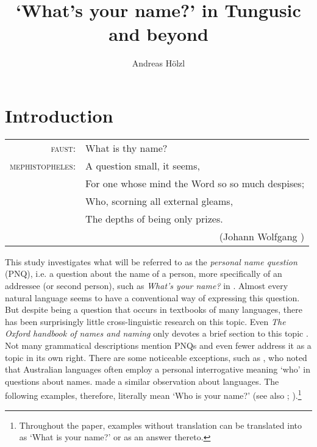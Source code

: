 \documentclass[output=paper,colorlinks,citecolor=brown]{langscibook}
\author{Andreas Hölzl\affiliation{University of Potsdam}}
\title{‘What’s your name?’ in Tungusic and beyond}
\begin{document}
\maketitle

\section{Introduction} 

\begin{flushright}
\begin{tabular}{@{}r@{~}l@{}}
    \textsc{faust}: & What is thy name?\\
    \textsc{mephistopheles}: & A question small, it seems,\\
                    & For one whose mind the Word so so much despises;\\
                    & Who, scorning all external gleams,\\
                    & The depths of being only prizes.\\
    \multicolumn{2}{r}{(Johann Wolfgang \citealt{vonGoethe2018})}
\end{tabular}
\end{flushright}
\bigskip
\noindent This study investigates what will be referred to as the \textit{personal name question} (PNQ), i.e. a question about the name of a person, more specifically of an addressee (or second person), such as \textit{What’s your name?} in . Almost every natural language seems to have a conventional way of expressing this question. But despite being a question that occurs in textbooks of many languages, there has been surprisingly little cross-linguistic research on this topic. Even \textit{The Oxford handbook of names and naming} \citep{Hough2016} only devotes a brief section to this topic \citep[26]{VanLangendonck2016}. Not many grammatical descriptions mention PNQs and even fewer address it as a topic in its own right. There are some noticeable exceptions, such as \citet[8, 19]{Mushin1995}, who noted that Australian languages often employ a personal interrogative meaning ‘who’ in questions about names. \citet[509f.]{Blust2013} made a similar observation about  languages. The following examples, therefore, literally mean ‘Who is your name?’ (see also \citealt{Hölzl2014}; \citealt{Gil2018}).\footnote{Throughout the paper, examples without translation can be translated into  as ‘What is your name?’ or as an answer thereto.}
\end{document}
